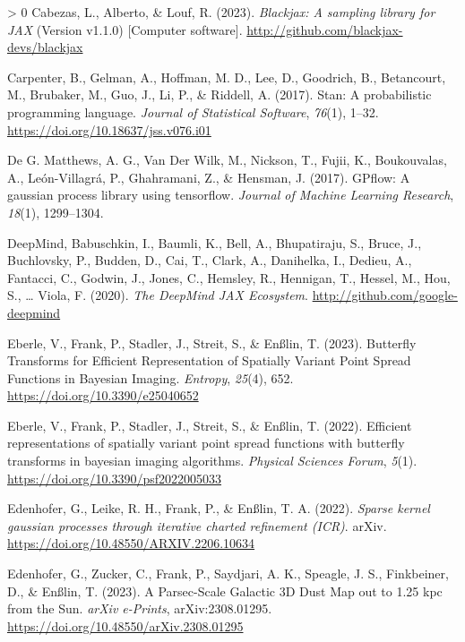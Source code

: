 \documentclass[10pt,a4paper,onecolumn]{article}
\newlength{\cslhangindent}
\newenvironment{CSLReferences}[3] %
 {%
  \setlength{\parindent}{0pt}
  \ifodd #1 \everypar{\setlength{\hangindent}{\cslhangindent}}\ignorespaces\fi
  \ifnum #2 > 0
  \setlength{\parskip}{#2\baselineskip}
  \fi
 }%
 {}
\begin{document}
\begin{CSLReferences}{1}{0}
\leavevmode\hypertarget{ref-blackjax2020}{}%
Cabezas, L., Alberto, \& Louf, R. (2023). \emph{{B}lackjax: A sampling
library for {JAX}} (Version v1.1.0) {[}Computer software{]}.
\url{http://github.com/blackjax-devs/blackjax}

\leavevmode\hypertarget{ref-Carpenter2017}{}%
Carpenter, B., Gelman, A., Hoffman, M. D., Lee, D., Goodrich, B.,
Betancourt, M., Brubaker, M., Guo, J., Li, P., \& Riddell, A. (2017).
Stan: A probabilistic programming language. \emph{Journal of Statistical
Software}, \emph{76}(1), 1--32.
\url{https://doi.org/10.18637/jss.v076.i01}

\leavevmode\hypertarget{ref-Matthews2017}{}%
De G. Matthews, A. G., Van Der Wilk, M., Nickson, T., Fujii, K.,
Boukouvalas, A., León-Villagrá, P., Ghahramani, Z., \& Hensman, J.
(2017). GPflow: A gaussian process library using tensorflow.
\emph{Journal of Machine Learning Research}, \emph{18}(1), 1299--1304.

\leavevmode\hypertarget{ref-Deepmind2020Optax}{}%
DeepMind, Babuschkin, I., Baumli, K., Bell, A., Bhupatiraju, S., Bruce,
J., Buchlovsky, P., Budden, D., Cai, T., Clark, A., Danihelka, I.,
Dedieu, A., Fantacci, C., Godwin, J., Jones, C., Hemsley, R., Hennigan,
T., Hessel, M., Hou, S., \ldots{} Viola, F. (2020). \emph{The
{D}eep{M}ind {JAX} {E}cosystem}. \url{http://github.com/google-deepmind}

\leavevmode\hypertarget{ref-Eberle2023ButterflyImaging}{}%
Eberle, V., Frank, P., Stadler, J., Streit, S., \& Enßlin, T. (2023).
{Butterfly Transforms for Efficient Representation of Spatially Variant
Point Spread Functions in Bayesian Imaging}. \emph{Entropy},
\emph{25}(4), 652. \url{https://doi.org/10.3390/e25040652}

\leavevmode\hypertarget{ref-Eberle2023ButterflyImagingAlgorithm}{}%
Eberle, V., Frank, P., Stadler, J., Streit, S., \& Enßlin, T. (2022).
Efficient representations of spatially variant point spread functions
with butterfly transforms in bayesian imaging algorithms. \emph{Physical
Sciences Forum}, \emph{5}(1).
\url{https://doi.org/10.3390/psf2022005033}

\leavevmode\hypertarget{ref-Edenhofer2022}{}%
Edenhofer, G., Leike, R. H., Frank, P., \& Enßlin, T. A. (2022).
\emph{Sparse kernel gaussian processes through iterative charted
refinement (ICR)}. arXiv.
\url{https://doi.org/10.48550/ARXIV.2206.10634}

\leavevmode\hypertarget{ref-Edenhofer2023}{}%
Edenhofer, G., Zucker, C., Frank, P., Saydjari, A. K., Speagle, J. S.,
Finkbeiner, D., \& Enßlin, T. (2023). {A Parsec-Scale Galactic 3D Dust
Map out to 1.25 kpc from the Sun}. \emph{arXiv e-Prints},
arXiv:2308.01295. \url{https://doi.org/10.48550/arXiv.2308.01295}


\end{CSLReferences}
\end{document}
